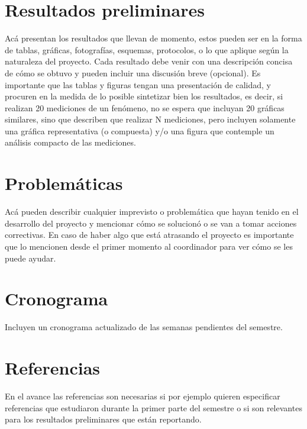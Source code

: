 \section{Resultados preliminares}

Acá presentan los resultados que llevan de momento, estos pueden ser en la forma de tablas, gráficas, fotografías, esquemas, protocolos, o lo que aplique según la naturaleza del proyecto. Cada resultado debe venir con una descripción concisa de cómo se obtuvo y pueden incluir una discusión breve (opcional). Es importante que las tablas y figuras tengan una presentación de calidad, y procuren en la medida de lo posible sintetizar bien los resultados, es decir, si realizan 20 mediciones de un fenómeno, no se espera que incluyan 20 gráficas similares, sino que describen que realizar N mediciones, pero incluyen solamente una gráfica representativa (o compuesta) y/o una figura que contemple un análisis compacto de las mediciones.

\section{Problemáticas}

Acá pueden describir cualquier imprevisto o problemática que hayan tenido en el desarrollo del proyecto y mencionar cómo se solucionó o se van a tomar acciones correctivas. En caso de haber algo que está atrasando el proyecto es importante que lo mencionen desde el primer momento al coordinador para ver cómo se les puede ayudar. 

\section{Cronograma}

Incluyen un cronograma actualizado de las semanas pendientes del semestre. 

\section{Referencias} %

En el avance las referencias son necesarias si por ejemplo quieren especificar referencias que estudiaron durante la primer parte del semestre o si son relevantes para los resultados preliminares que están reportando. 

